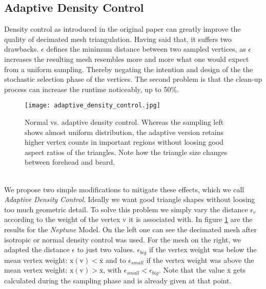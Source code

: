 \newpage
\subsection{Adaptive Density Control}
\label{topstoc122}

Density control as introduced in the original paper can greatly improve the quality of decimated mesh triangulation.
Having said that, it suffers two drawbacks. 
$\epsilon$ defines the minimum distance between two sampled vertices, as $\epsilon$ increases the resulting mesh resembles more and more what one would expect from a uniform sampling. 
Thereby negating the intention and design of the the stochastic selection phase of the vertices.
The second problem is that the clean-up process can increase the runtime noticeably, up to 50\%.
\begin{figure}[ht]
\centering
\texttt{[image: adaptive\_density\_control.jpg]}
\caption{Normal vs. adaptive density control. Whereas the sampling left shows almost uniform distribution, the adaptive version retains higher vertex counts in important regions without loosing good aspect ratios of the triangles. Note how the triangle size changes between forehead and beard.}
\label{fig:adaptive_density_control}
\end{figure}\\
We propose two simple modifications to mitigate these effects, which we call \textit{Adaptive Density Control}.
Ideally we want good triangle shapes without loosing too much geometric detail.
To solve this problem we simply vary the distance $\epsilon_{v}$ according to the weight of the vertex $\mathrm{v}$ it is associated with.
In figure \ref{fig:adaptive_density_control} are the results for the \textit{Neptune} Model.
On the left one can see the decimated mesh after isotropic or normal density control was used.
For the mesh on the right, we adapted the distance $\epsilon$ to just two values.
$\epsilon_{big}$ if the vertex weight was below the mean vertex weight: $\mathrm{x}(\mathrm{v}) < \overline{\mathrm{x}}$ and to $\epsilon_{small}$ if the vertex weight was above the mean vertex weight: $\mathrm{x}(\mathrm{v}) > \overline{\mathrm{x}}$, with $\epsilon_{small} < \epsilon_{big}$.
Note that the value $\overline{\mathrm{x}}$ gets calculated during the sampling phase and is already given at that point.

